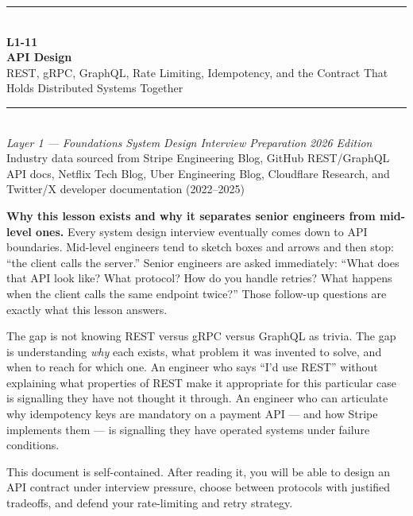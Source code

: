 \documentclass[11pt,a4paper]{article}
\begin{document}
\begin{titlepage}
\vspace*{2cm}
\begin{center}
  {\color{primary}\rule{\linewidth}{3pt}}\\[12pt]
  {\huge\bfseries\color{highlight} L1-11}\\[6pt]
  {\Huge\bfseries\color{primary} API Design}\\[10pt]
  {\large\color{primary!70} REST, gRPC, GraphQL, Rate Limiting, Idempotency, and the Contract That Holds Distributed Systems Together}\\[20pt]
  {\color{primary}\rule{\linewidth}{1pt}}\\[16pt]
  {\normalsize\color{primary!70}
    \textit{Layer 1 --- Foundations} \quad\textbullet\quad
    \textit{System Design Interview Preparation} \quad\textbullet\quad
    \textit{2026 Edition}
  }\\[8pt]
  {\small\color{primary!60} Industry data sourced from Stripe Engineering Blog, GitHub REST/GraphQL API docs, Netflix Tech Blog, Uber Engineering Blog, Cloudflare Research, and Twitter/X developer documentation (2022--2025)}
\end{center}
\vfill
\begin{insightbox}
\textbf{Why this lesson exists and why it separates senior engineers from mid-level ones.} Every system design interview eventually comes down to API boundaries. Mid-level engineers tend to sketch boxes and arrows and then stop: ``the client calls the server.'' Senior engineers are asked immediately: ``What does that API look like? What protocol? How do you handle retries? What happens when the client calls the same endpoint twice?'' Those follow-up questions are exactly what this lesson answers.

The gap is not knowing REST versus gRPC versus GraphQL as trivia. The gap is understanding \emph{why} each exists, what problem it was invented to solve, and when to reach for which one. An engineer who says ``I'd use REST'' without explaining what properties of REST make it appropriate for this particular case is signalling they have not thought it through. An engineer who can articulate why idempotency keys are mandatory on a payment API --- and how Stripe implements them --- is signalling they have operated systems under failure conditions.

This document is self-contained. After reading it, you will be able to design an API contract under interview pressure, choose between protocols with justified tradeoffs, and defend your rate-limiting and retry strategy.
\end{insightbox}
\vspace{1cm}
\tableofcontents
\end{titlepage}
\end{document}
